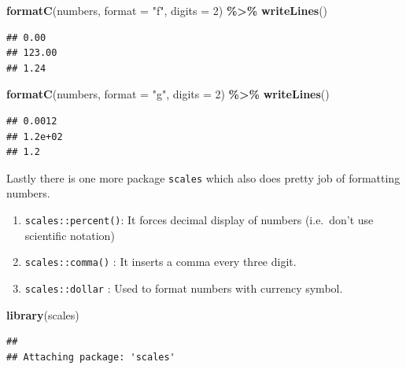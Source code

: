 \documentclass[
]{book}
\newenvironment{Shaded}{\begin{snugshade}}{\end{snugshade}}
\newcommand{\AttributeTok}[1]{\textcolor[rgb]{0.13,0.29,0.53}{#1}}
\newcommand{\DecValTok}[1]{\textcolor[rgb]{0.00,0.00,0.81}{#1}}
\newcommand{\FunctionTok}[1]{\textcolor[rgb]{0.13,0.29,0.53}{\textbf{#1}}}
\newcommand{\NormalTok}[1]{#1}
\newcommand{\SpecialCharTok}[1]{\textcolor[rgb]{0.81,0.36,0.00}{\textbf{#1}}}
\newcommand{\StringTok}[1]{\textcolor[rgb]{0.31,0.60,0.02}{#1}}
\providecommand{\tightlist}{%
  \setlength{\itemsep}{0pt}\setlength{\parskip}{0pt}}
\begin{document}
\begin{Shaded}
\begin{Highlighting}[]
\FunctionTok{formatC}\NormalTok{(numbers,}
        \AttributeTok{format =} \StringTok{"f"}\NormalTok{,}
        \AttributeTok{digits =} \DecValTok{2}\NormalTok{) }\SpecialCharTok{\%\textgreater{}\%} 
  \FunctionTok{writeLines}\NormalTok{()}
\end{Highlighting}
\end{Shaded}

\begin{verbatim}
## 0.00
## 123.00
## 1.24
\end{verbatim}

\begin{Shaded}
\begin{Highlighting}[]
\FunctionTok{formatC}\NormalTok{(numbers,}
        \AttributeTok{format =} \StringTok{"g"}\NormalTok{,}
        \AttributeTok{digits =} \DecValTok{2}\NormalTok{) }\SpecialCharTok{\%\textgreater{}\%} 
  \FunctionTok{writeLines}\NormalTok{()}
\end{Highlighting}
\end{Shaded}

\begin{verbatim}
## 0.0012
## 1.2e+02
## 1.2
\end{verbatim}

Lastly there is one more package \texttt{scales} which also does pretty job of formatting numbers.

\begin{enumerate}
\def\labelenumi{\arabic{enumi}.}
\tightlist
\item
  \texttt{scales::percent()}: It forces decimal display of numbers (i.e.~don't use scientific notation)
\item
  \texttt{scales::comma()} : It inserts a comma every three digit.
\item
  \texttt{scales::dollar} : Used to format numbers with currency symbol.
\end{enumerate}

\begin{Shaded}
\begin{Highlighting}[]
\FunctionTok{library}\NormalTok{(scales)}
\end{Highlighting}
\end{Shaded}

\begin{verbatim}
## 
## Attaching package: 'scales'
\end{verbatim}
\end{document}
